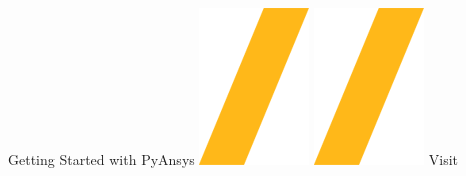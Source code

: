 \documentclass[9pt,landscape]{article}
\begin{document}
\vspace{-0.15cm}
\noindent\makebox[\linewidth]{\rule{\paperwidth}{4pt}}
\begin{center}
Getting Started with PyAnsys \includegraphics[height=\fontcharht\font`\S]{slash.png} \href{https://github.com/pyansys}{\color{blue}{PyAnsys on GitHub}} \includegraphics[height=\fontcharht\font`\S]{slash.png} Visit 
\end{center}
\end{document}
